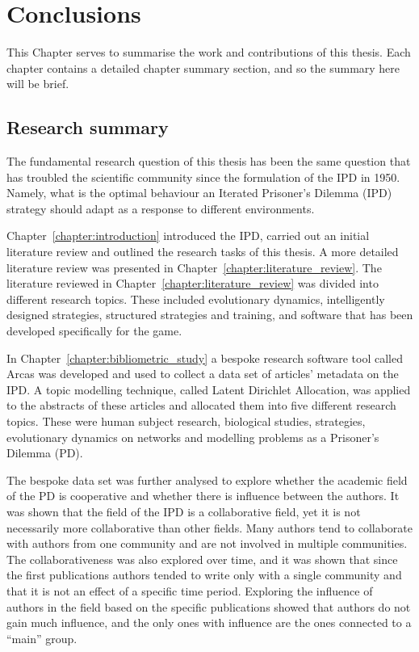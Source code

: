 \chapter{Conclusions}\label{chapter:conclusion}

This Chapter serves to summarise the work and contributions of this thesis. Each
chapter contains a detailed chapter summary section, and so the summary here will be
brief.

\section{Research summary}

The fundamental research question of this thesis has been the same question that
has troubled the scientific community since the formulation of the IPD in 1950.
Namely, what is the optimal behaviour an Iterated Prisoner's Dilemma (IPD)
strategy should adapt as a response to different environments.

Chapter~\ref{chapter:introduction} introduced the IPD,
carried out an initial literature review and outlined the research tasks of this
thesis. A more detailed literature review was presented in
Chapter~\ref{chapter:literature_review}. The literature reviewed in
Chapter~\ref{chapter:literature_review} was divided into different research
topics. These included evolutionary dynamics, intelligently designed strategies,
structured strategies and training, and software that has been developed
specifically for the game.

In Chapter~\ref{chapter:bibliometric_study} a bespoke research software tool
called Arcas was developed and used to collect a data set
of articles' metadata on the IPD. A topic modelling
technique, called Latent Dirichlet Allocation, was applied to the abstracts of these
articles and allocated them into five different research topics. These were human
subject research, biological studies, strategies, evolutionary dynamics on
networks and modelling problems as a Prisoner's Dilemma (PD).

The bespoke data set was further analysed to explore whether the academic field
of the PD is cooperative and whether there is influence between
the authors. It was shown that the field of the IPD is a
collaborative field, yet it is not necessarily more collaborative than other
fields. Many authors tend to collaborate with authors from one community
and are not involved in multiple communities. The collaborativeness was also
explored over time, and it was shown that since the first publications authors
tended to write only with a single community and that it is not an effect of a
specific time period. Exploring the influence of authors
in the field based on the specific publications showed that authors do not gain
much influence, and the only ones with influence are the ones connected to a
``main'' group.

